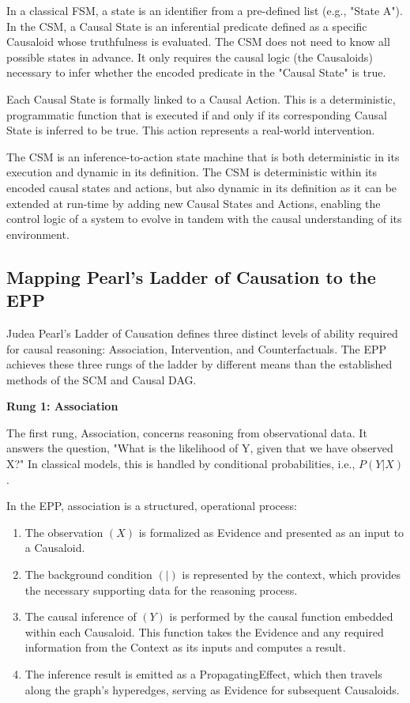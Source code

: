 In a classical FSM, a state is an identifier from a pre-defined list (e.g., "State A").
In the CSM, a Causal State is an inferential predicate defined as a specific Causaloid whose truthfulness is evaluated. The CSM does not need to know all possible states in advance. It only requires the causal logic (the Causaloids) necessary to infer whether the encoded predicate in the "Causal State" is true. 

Each Causal State is formally linked to a Causal Action. This is a deterministic, programmatic function that is executed if and only if its corresponding Causal State is inferred to be true. This action represents a real-world intervention.

The CSM is an inference-to-action state machine that is both deterministic in its execution and dynamic in its definition. The CSM is deterministic within its encoded causal states and actions, but also dynamic in its definition as it can be extended at run-time by adding new Causal States and Actions, enabling the control logic of a system to evolve in tandem with the causal understanding of its environment. 

%
%
\subsection{Mapping Pearl's Ladder of Causation to the EPP}
\label{sec:epp_ladder_causation}

Judea Pearl's Ladder of Causation\cite{pearl2000causality} defines three distinct levels of ability required for causal reasoning: Association, Intervention, and Counterfactuals. The EPP achieves these three rungs of the ladder by different means than the established methods of the SCM and Causal DAG.  

\textbf{Rung 1: Association}

The first rung, Association, concerns reasoning from observational data. 
It answers the question, "What is the likelihood of Y, given that we have observed X?" In classical models, this is handled by conditional probabilities, i.e., $P(Y|X)$.

In the EPP, association is a structured, operational process:

\begin{enumerate}
	\item The observation $(X)$ is formalized as Evidence and presented as an input to a Causaloid.
	\item The background condition $(|)$ is represented by the context, which provides the necessary supporting data for the reasoning process.
	\item The causal inference of $(Y)$ is performed by the causal function embedded within each Causaloid. This function takes the Evidence and any required information from the Context as its inputs and computes a result.
	\item The inference result is emitted as a PropagatingEffect, which then travels along the graph's hyperedges, serving as Evidence for subsequent Causaloids.
\end{enumerate}

